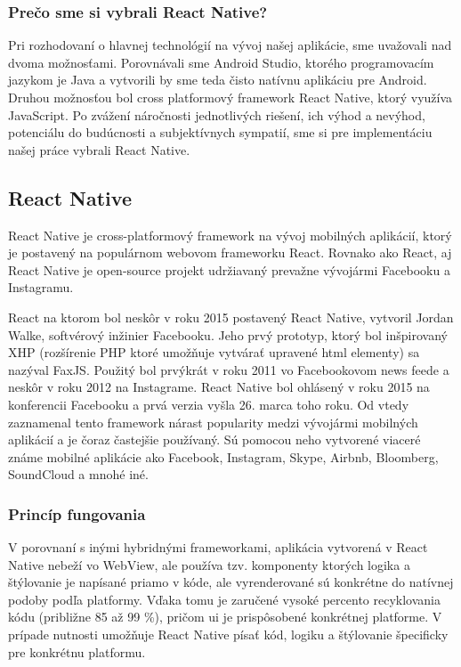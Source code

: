 \subsubsection{Prečo sme si vybrali React Native?}
Pri rozhodovaní o hlavnej technológií na vývoj našej aplikácie, sme uvažovali nad dvoma možnosťami. Porovnávali sme Android Studio, ktorého programovacím jazykom je Java a vytvorili by sme teda čisto natívnu aplikáciu pre Android. Druhou možnosťou bol cross platformový framework React Native, ktorý využíva JavaScript. Po zvážení náročnosti jednotlivých riešení, ich výhod a nevýhod, potenciálu do budúcnosti a subjektívnych sympatií, sme si pre implementáciu našej práce vybrali React Native. \\

\subsection{React Native}
\label{sec:React Native}

React Native je cross-platformový framework na vývoj mobilných aplikácií, ktorý je postavený na populárnom webovom frameworku React. Rovnako ako React, aj React Native je open-source projekt udržiavaný prevažne vývojármi Facebooku a Instagramu.

React na ktorom bol neskôr v roku 2015 postavený React Native, vytvoril Jordan Walke, softvérový inžinier Facebooku. Jeho prvý prototyp, ktorý bol inšpirovaný XHP (rozšírenie PHP ktoré umožňuje vytvárať upravené \acrshort{html} elementy) sa nazýval FaxJS. Použitý bol prvýkrát v roku 2011 vo Facebookovom news feede a neskôr v roku 2012 na Instagrame. \cite{rn2} React Native bol ohlásený v roku 2015 na konferencii Facebooku a prvá verzia vyšla 26. marca toho roku. Od vtedy zaznamenal tento framework nárast popularity medzi vývojármi mobilných aplikácií a je čoraz častejšie používaný. Sú pomocou neho vytvorené viaceré známe mobilné aplikácie ako Facebook, Instagram, Skype, Airbnb, Bloomberg, SoundCloud a mnohé iné. \\
\subsubsection{Princíp fungovania}
V porovnaní s inými hybridnými frameworkami, aplikácia vytvorená v React Native nebeží vo WebView, ale používa tzv. komponenty ktorých logika a štýlovanie je napísané priamo v kóde, ale vyrenderované sú konkrétne do natívnej podoby podľa platformy. Vďaka tomu je zaručené vysoké percento recyklovania kódu (približne 85 až 99 \%), pričom \acrshort{ui} je prispôsobené konkrétnej platforme. V prípade nutnosti umožňuje React Native písať kód, logiku a štýlovanie špecificky pre konkrétnu platformu. \\
